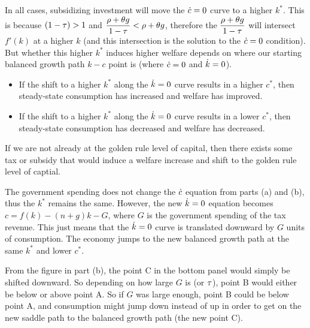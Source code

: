 \documentclass[12pt]{article}
\begin{document}
\newpage{}

In all cases, subsidizing investment will move the $\dot c=0$ curve to a higher $k^*$. This is because $(1-\tau)>1$ and $\dfrac{\rho+\theta g}{1-\tau}<\rho+\theta g$, therefore the $\dfrac{\rho+\theta g}{1-\tau}$ will intersect $f'(k)$ at a higher $k$ (and this intersection is the solution to the $\dot c=0$ condition). But whether this higher $k^*$ induces higher welfare depends on where our starting balanced growth path $k-c$ point is (where $\dot c=0$ and $\dot k=0$). 

\begin{itemize}
    \item If the shift to a higher $k^*$ along the $\dot k=0$ curve results in a higher $c^*$, then steady-state consumption has increased and welfare has improved.
    \item If the shift to a higher $k^*$ along the $\dot k=0$ curve results in a lower $c^*$, then steady-state consumption has decreased and welfare has decreased.
\end{itemize}

If we are not already at the golden rule level of capital, then there exists some tax or subsidy that would induce a welfare increase and shift to the golden rule level of captial.




\newpage{}

The government spending does not change the $\dot c$ equation from parts (a) and (b), thus the $k^*$ remains the same. However, the new $\dot k=0$ equation becomes $c=f(k)-(n+g)k-G$, where $G$ is the government spending of the tax revenue. This just means that the $\dot k=0$ curve is translated downward by $G$ units of consumption. The economy jumps to the new balanced growth path at the same $k^*$ and lower $c^*$. 

From the figure in part (b), the point C in the bottom panel would simply be shifted downward. So depending on how large $G$ is (or $\tau$), point B would either be below or above point A. So if $G$ was large enough, point B could be below point A, and consumption might jump down instead of up in order to get on the new saddle path to the balanced growth path (the new point C).
\end{document}
